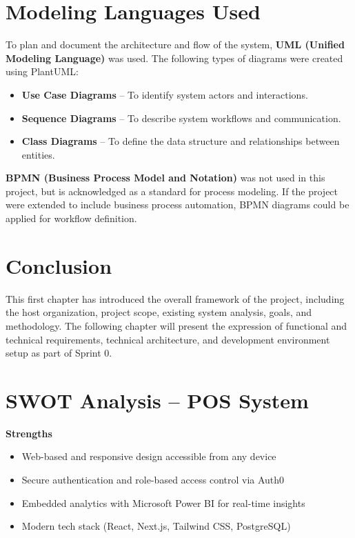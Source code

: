 \section{Modeling Languages Used}

To plan and document the architecture and flow of the system, \textbf{UML (Unified Modeling Language)} was used. The following types of diagrams were created using PlantUML:

\begin{itemize}
  \item \textbf{Use Case Diagrams} – To identify system actors and interactions.
  \item \textbf{Sequence Diagrams} – To describe system workflows and communication.
  \item \textbf{Class Diagrams} – To define the data structure and relationships between entities.
\end{itemize}

\textbf{BPMN (Business Process Model and Notation)} was not used in this project, but is acknowledged as a standard for process modeling. If the project were extended to include business process automation, BPMN diagrams could be applied for workflow definition.

\section{Conclusion}

This first chapter has introduced the overall framework of the project, including the host organization, project scope, existing system analysis, goals, and methodology. The following chapter will present the expression of functional and technical requirements, technical architecture, and development environment setup as part of Sprint 0.
\section*{SWOT Analysis – POS System}

\textbf{Strengths}
\begin{itemize}
  \item Web-based and responsive design accessible from any device
  \item Secure authentication and role-based access control via Auth0
  \item Embedded analytics with Microsoft Power BI for real-time insights
  \item Modern tech stack (React, Next.js, Tailwind CSS, PostgreSQL)
\end{itemize}

